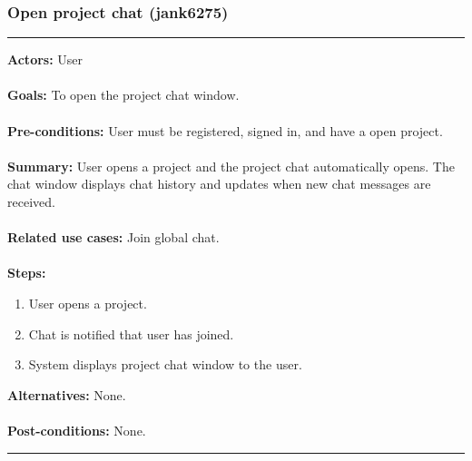 \documentclass[11pt]{report}
\begin{document}
\subsubsection{Open project chat (jank6275)}
\vspace{2pt}
\hrule
\vspace{8pt}
 \textbf{Actors:} User \\ \\
\textbf{Goals:} To open the project chat window. \\ \\
 \textbf{Pre-conditions:} User must be registered, signed in, and have a open project.  \\ \\
 \textbf{Summary:} User opens a project and the project chat automatically opens. The chat window displays chat history and updates when new chat messages are received. \\ \\
\textbf{Related use cases:} Join global chat. \\ \\
\textbf{Steps:} \begin{enumerate}
  \item User opens a project.
  \item Chat is notified that user has joined.
  \item System displays project chat window to the user.
 \end{enumerate}
 \textbf{Alternatives:} None. \\ \\
 \textbf{Post-conditions:} None. \\
\vspace{8pt}
\hrule
\newpage
\end{document}
